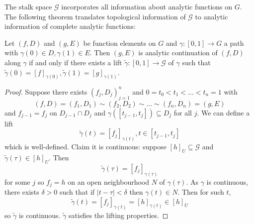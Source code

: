 \documentclass[a4paper]{article}
\begin{document}
The stalk space \(\mathcal G\) incorporates all information about analytic functions on \(G\). The following theorem translates topological information of \(\mathcal G\) to analytic information of complete analytic functions:

\begin{theorem}
  Let \((f, D)\) and \((g, E)\) be function elements on \(G\) and \(\gamma: [0, 1] \to G\) a path with \(\gamma(0) \in D, \gamma(1) \in E\). Then \((g, E)\) is analytic continuation of \((f, D)\) along \(\gamma\) if and only if there exists a lift \(\tilde \gamma: [0, 1] \to \mathcal G\) of \(\gamma\) such that \(\tilde \gamma(0) = [f]_{\gamma(0)}, \tilde \gamma(1) = [g]_{\gamma(1)}\).
\end{theorem}

\begin{proof}
  Suppose there exists \((f_j, D_j)_{j = 1}^n\) and \(0 = t_0 < t_1 < \dots < t_n = 1\) with
  \[
    (f, D) = (f_1, D_1) \sim (f_2, D_2) \sim \dots \sim (f_n, D_n) = (g, E)
  \]
  and \(f_{j - 1} = f_j\) on \(D_{j - 1} \cap D_j\) and \(\gamma([t_{j - 1}, t_j]) \subseteq D_j\) for all \(j\). We can define a lift
  \[
    \tilde \gamma(t) = [f_j]_{\gamma(t)}, t \in [t_{j - 1}, t_j]
  \]
  which is well-defined. Claim it is continuous: suppose \([h]_U \subseteq \mathcal G\) and \(\tilde \gamma(\tau) \in [h]_U\). Then
  \[
    \tilde \gamma(\tau) = [f_j]_{\gamma(\tau)}
  \]
  for some \(j\) so \(f_j = h\) on an open neighbourhood \(N\) of \(\gamma(\tau)\). As \(\gamma\) is continuous, there exists \(\delta > 0\) such that if \(|t - \tau| < \delta\) then \(\gamma(t) \in N\). Then for such \(t\),
  \[
    \tilde \gamma(t) = [f_j]_{\gamma(t)} = [h]_{\gamma(t)} \in [h]_U
  \]
  so \(\tilde \gamma\) is continuous. \(\tilde \gamma\) satisfies the lifting properties.


\end{proof}
\end{document}
